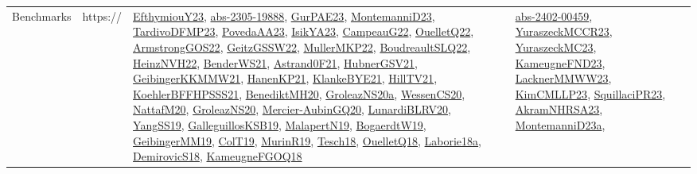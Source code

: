 {\begin{longtable}{lp{3cm}>{\raggedright}p{6cm}>{\raggedright}p{6cm}p{8cm}}
Benchmarks & https:// & \href{papers/EfthymiouY23.pdf}{EfthymiouY23}\cite{EfthymiouY23}, \href{articles/abs-2305-19888.pdf}{abs-2305-19888}\cite{abs-2305-19888}, \href{articles/GurPAE23.pdf}{GurPAE23}\cite{GurPAE23}, \href{articles/MontemanniD23.pdf}{MontemanniD23}\cite{MontemanniD23}, \href{papers/TardivoDFMP23.pdf}{TardivoDFMP23}\cite{TardivoDFMP23}, \href{papers/PovedaAA23.pdf}{PovedaAA23}\cite{PovedaAA23}, \href{articles/IsikYA23.pdf}{IsikYA23}\cite{IsikYA23}, \href{articles/CampeauG22.pdf}{CampeauG22}\cite{CampeauG22}, \href{papers/OuelletQ22.pdf}{OuelletQ22}\cite{OuelletQ22}, \href{papers/ArmstrongGOS22.pdf}{ArmstrongGOS22}\cite{ArmstrongGOS22}, \href{papers/GeitzGSSW22.pdf}{GeitzGSSW22}\cite{GeitzGSSW22}, \href{articles/MullerMKP22.pdf}{MullerMKP22}\cite{MullerMKP22}, \href{papers/BoudreaultSLQ22.pdf}{BoudreaultSLQ22}\cite{BoudreaultSLQ22}, \href{articles/HeinzNVH22.pdf}{HeinzNVH22}\cite{HeinzNVH22}, \href{papers/BenderWS21.pdf}{BenderWS21}\cite{BenderWS21}, \href{papers/Astrand0F21.pdf}{Astrand0F21}\cite{Astrand0F21}, \href{articles/HubnerGSV21.pdf}{HubnerGSV21}\cite{HubnerGSV21}, \href{papers/GeibingerKKMMW21.pdf}{GeibingerKKMMW21}\cite{GeibingerKKMMW21}, \href{papers/HanenKP21.pdf}{HanenKP21}\cite{HanenKP21}, \href{papers/KlankeBYE21.pdf}{KlankeBYE21}\cite{KlankeBYE21}, \href{papers/HillTV21.pdf}{HillTV21}\cite{HillTV21}, \href{articles/KoehlerBFFHPSSS21.pdf}{KoehlerBFFHPSSS21}\cite{KoehlerBFFHPSSS21}, \href{articles/BenediktMH20.pdf}{BenediktMH20}\cite{BenediktMH20}, \href{papers/GroleazNS20a.pdf}{GroleazNS20a}\cite{GroleazNS20a}, \href{papers/WessenCS20.pdf}{WessenCS20}\cite{WessenCS20}, \href{papers/NattafM20.pdf}{NattafM20}\cite{NattafM20}, \href{papers/GroleazNS20.pdf}{GroleazNS20}\cite{GroleazNS20}, \href{papers/Mercier-AubinGQ20.pdf}{Mercier-AubinGQ20}\cite{Mercier-AubinGQ20}, \href{articles/LunardiBLRV20.pdf}{LunardiBLRV20}\cite{LunardiBLRV20}, \href{papers/YangSS19.pdf}{YangSS19}\cite{YangSS19}, \href{papers/GalleguillosKSB19.pdf}{GalleguillosKSB19}\cite{GalleguillosKSB19}, \href{papers/MalapertN19.pdf}{MalapertN19}\cite{MalapertN19}, \href{papers/BogaerdtW19.pdf}{BogaerdtW19}\cite{BogaerdtW19}, \href{papers/GeibingerMM19.pdf}{GeibingerMM19}\cite{GeibingerMM19}, \href{papers/ColT19.pdf}{ColT19}\cite{ColT19}, \href{papers/MurinR19.pdf}{MurinR19}\cite{MurinR19}, \href{papers/Tesch18.pdf}{Tesch18}\cite{Tesch18}, \href{papers/OuelletQ18.pdf}{OuelletQ18}\cite{OuelletQ18}, \href{papers/Laborie18a.pdf}{Laborie18a}\cite{Laborie18a}, \href{papers/DemirovicS18.pdf}{DemirovicS18}\cite{DemirovicS18}, \href{papers/KameugneFGOQ18.pdf}{KameugneFGOQ18}\cite{KameugneFGOQ18} & \href{articles/abs-2402-00459.pdf}{abs-2402-00459}\cite{abs-2402-00459}, \href{articles/YuraszeckMCCR23.pdf}{YuraszeckMCCR23}\cite{YuraszeckMCCR23}, \href{papers/YuraszeckMC23.pdf}{YuraszeckMC23}\cite{YuraszeckMC23}, \href{papers/KameugneFND23.pdf}{KameugneFND23}\cite{KameugneFND23}, \href{articles/LacknerMMWW23.pdf}{LacknerMMWW23}\cite{LacknerMMWW23}, \href{papers/KimCMLLP23.pdf}{KimCMLLP23}\cite{KimCMLLP23}, \href{papers/SquillaciPR23.pdf}{SquillaciPR23}\cite{SquillaciPR23}, \href{articles/AkramNHRSA23.pdf}{AkramNHRSA23}\cite{AkramNHRSA23}, \href{articles/MontemanniD23a.pdf}{MontemanniD23a}\cite{MontemanniD23a}, 
\end{longtable}}
